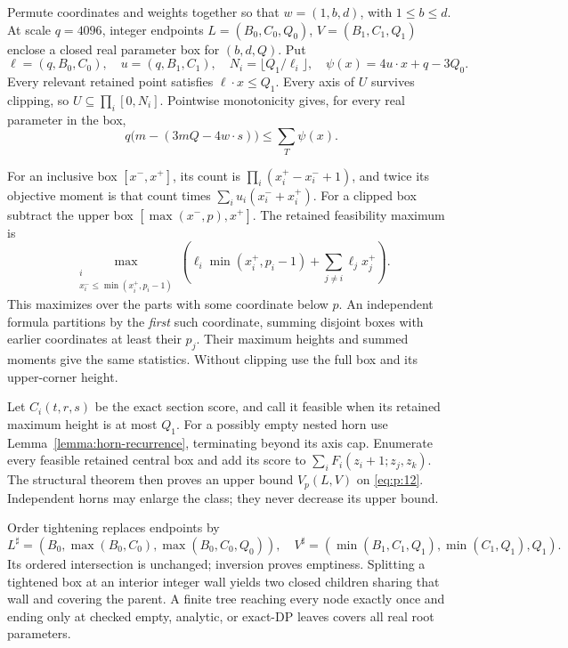 Permute coordinates and weights together so that
\(w=(1,b,d)\), with \(1\le b\le d\).
At scale \(q=4096\), integer endpoints \(L=(B_0,C_0,Q_0)\),
\(V=(B_1,C_1,Q_1)\) enclose a closed real parameter box for \((b,d,Q)\).
Put
\[
\ell=(q,B_0,C_0),\quad u=(q,B_1,C_1),\quad
N_i=\lfloor Q_1/\ell_i\rfloor,\quad
\psi(x)=4u\cdot x+q-3Q_0.
\]
Every relevant retained point satisfies \(\ell\cdot x\le Q_1\).
Every axis of \(U\) survives clipping, so \(U\subseteq\prod_i[0,N_i]\).
Pointwise monotonicity gives, for every real parameter in the box,
\begin{equation}
q\bigl(m-(3mQ-4w\cdot s)\bigr)\le\sum_T\psi(x).
\label{eq:p:12}
\end{equation}

For an inclusive box \([x^-,x^+]\), its count is
\(\prod_i(x_i^+-x_i^-+1)\), and twice its objective moment is that count
times \(\sum_i u_i(x_i^-+x_i^+)\). For a clipped box subtract the upper box
\([\max(x^-,p),x^+]\).
The retained feasibility maximum is
\begin{equation}
\max_{\substack{i\\x_i^-\le\min(x_i^+,p_i-1)}}
\left(\ell_i\min(x_i^+,p_i-1)+\sum_{j\ne i}\ell_jx_j^+\right).
\label{eq:p:13}
\end{equation}
This maximizes over the parts with some coordinate below \(p\).
An independent formula partitions by the \emph{first} such coordinate,
summing disjoint boxes with earlier coordinates at least their \(p_j\).
Their maximum heights and summed moments give the same statistics.
Without clipping use the full box and its upper-corner height.

Let \(C_i(t,r,s)\) be the exact section score, and call it feasible
when its retained maximum height is at most \(Q_1\).
For a possibly empty nested horn use
Lemma~\ref{lemma:horn-recurrence}, terminating beyond its axis cap.
Enumerate every feasible retained central box and add
its score to \(\sum_iF_i(z_i+1;z_j,z_k)\).
The structural theorem then proves an upper bound \(V_p(L,V)\) on \eqref{eq:p:12}.
Independent horns may enlarge the class; they never decrease its upper bound.

Order tightening replaces endpoints by
\begin{equation}
L^\sharp=(B_0,\max(B_0,C_0),\max(B_0,C_0,Q_0)),\quad
V^\sharp=(\min(B_1,C_1,Q_1),\min(C_1,Q_1),Q_1).
\label{eq:p:15}
\end{equation}
Its ordered intersection is unchanged; inversion proves emptiness.
Splitting a tightened box at an interior integer wall yields two closed
children sharing that wall and covering the parent.
A finite tree reaching every node exactly once and ending only at checked
empty, analytic, or exact-DP leaves covers all real root parameters.


